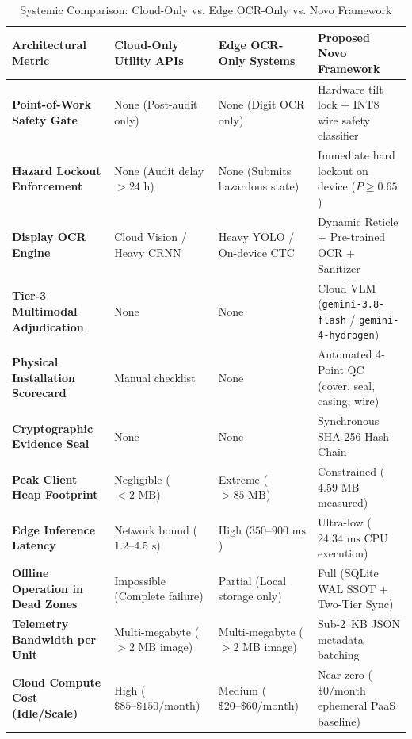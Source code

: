 \documentclass[conference]{IEEEtran}
\begin{document}
\begin{table}[t]
\caption{Systemic Comparison: Cloud-Only vs. Edge OCR-Only vs. Novo Framework}
\label{tab:system_comparison}
\centering
\small
\begin{tabularx}{\textwidth}{lXXX}
\toprule
\textbf{Architectural Metric} & \textbf{Cloud-Only Utility APIs} & \textbf{Edge OCR-Only Systems} & \textbf{Proposed Novo Framework} \\
\midrule
\textbf{Point-of-Work Safety Gate} & None (Post-audit only) & None (Digit OCR only) & Hardware tilt lock + INT8 wire safety classifier \\
\textbf{Hazard Lockout Enforcement} & None (Audit delay $>24\text{~h}$) & None (Submits hazardous state) & Immediate hard lockout on device ($P \ge 0.65$) \\
\textbf{Display OCR Engine} & Cloud Vision / Heavy CRNN & Heavy YOLO / On-device CTC & Dynamic Reticle + Pre-trained OCR + Sanitizer \\
\textbf{Tier-3 Multimodal Adjudication} & None & None & Cloud VLM (\texttt{gemini-3.8-flash} / \texttt{gemini-4-hydrogen}) \\
\textbf{Physical Installation Scorecard} & Manual checklist & None & Automated 4-Point QC (cover, seal, casing, wire) \\
\textbf{Cryptographic Evidence Seal} & None & None & Synchronous SHA-256 Hash Chain \\
\textbf{Peak Client Heap Footprint} & Negligible ($<2\text{~MB}$) & Extreme ($>85\text{~MB}$) & Constrained ($4.59\text{~MB}$ measured) \\
\textbf{Edge Inference Latency} & Network bound ($1.2\text{--}4.5\text{~s}$) & High ($350\text{--}900\text{~ms}$) & Ultra-low ($24.34\text{~ms}$ CPU execution) \\
\textbf{Offline Operation in Dead Zones} & Impossible (Complete failure) & Partial (Local storage only) & Full (SQLite WAL SSOT + Two-Tier Sync) \\
\textbf{Telemetry Bandwidth per Unit} & Multi-megabyte ($>2\text{~MB}$ image) & Multi-megabyte ($>2\text{~MB}$ image) & Sub-2~KB JSON metadata batching \\
\textbf{Cloud Compute Cost (Idle/Scale)} & High ($\$85\text{--}\$150/\text{month}$) & Medium ($\$20\text{--}\$60/\text{month}$) & Near-zero ($\$0/\text{month}$ ephemeral PaaS baseline) \\
\bottomrule
\end{tabularx}
\end{table}
\end{document}
